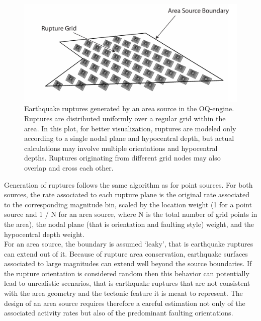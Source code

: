 \begin{figure}
\centering
\includegraphics[width=14cm]{./Pictures/AreaSource.pdf}
\caption{Earthquake ruptures generated by an area source in the OQ-engine. Ruptures are distributed uniformly over a regular grid within the area. In this plot, for better visualization, ruptures are modeled only according to a single nodal plane and hypocentral depth, but actual calculations may involve multiple orientations and hypocentral depths. Ruptures originating from different grid nodes may also overlap and cross each other.}
\label{fig:AreaSource}
\end{figure}
Generation of ruptures follows the same algorithm as for point sources. For both sources, the rate associated to each rupture plane is the original rate associated to the corresponding magnitude bin, scaled by the location weight (1 for a point source and 1 / N for an area source, where N is the total number of grid points in the area), the nodal plane (that is orientation and faulting style) weight, and the hypocentral depth weight.\\
For an area source, the boundary is assumed ‘leaky’, that is earthquake ruptures can extend out of it. Because of rupture area conservation, earthquake surfaces associated to large magnitudes can extend well beyond the source boundaries. If the rupture orientation is considered random then this behavior can potentially lead to unrealistic scenarios, that is earthquake ruptures that are not consistent with the area geometry and the tectonic feature it is meant to represent. The design of an area source requires therefore a careful estimation not only of the associated activity rates but also of the predominant faulting orientations.\\
